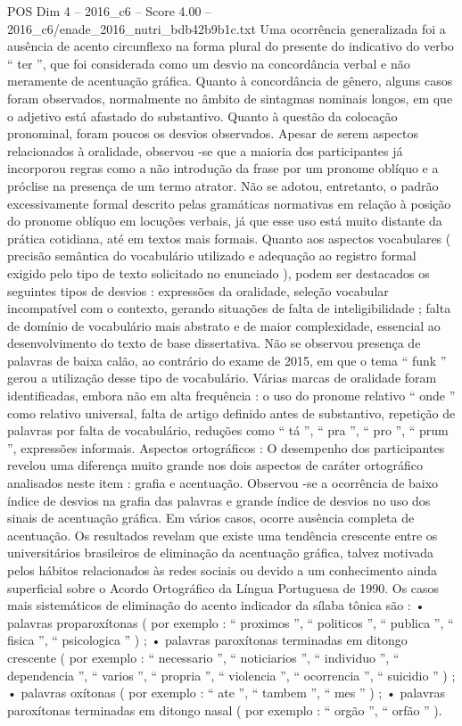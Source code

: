 \begin{textsample}{POS Dim 4 – 2016\_c6 – Score 4.00 – 2016\_c6/enade\_2016\_nutri\_bdb42b9b1c.txt}
Uma ocorrência generalizada foi a ausência de acento circunflexo na forma plural do presente do indicativo do verbo “ ter ”, que foi considerada como um desvio na concordância verbal e não meramente de acentuação gráfica.
Quanto à concordância de gênero, alguns casos foram observados, normalmente no âmbito de sintagmas nominais longos, em que o adjetivo está afastado do substantivo.
Quanto à questão da colocação pronominal, foram poucos os desvios observados.
Apesar de serem aspectos relacionados à oralidade, observou -se que a maioria dos participantes já incorporou regras como a não introdução da frase por um pronome oblíquo e a próclise na presença de um termo atrator.
Não se adotou, entretanto, o padrão excessivamente formal descrito pelas gramáticas normativas em relação à posição do pronome oblíquo em locuções verbais, já que esse uso está muito distante da prática cotidiana, até em textos mais formais.
Quanto aos aspectos vocabulares ( precisão semântica do vocabulário utilizado e adequação ao registro formal exigido pelo tipo de texto solicitado no enunciado ), podem ser destacados os seguintes tipos de desvios : expressões da oralidade, seleção vocabular incompatível com o contexto, gerando situações de falta de inteligibilidade ; falta de domínio de vocabulário mais abstrato e de maior complexidade, essencial ao desenvolvimento do texto de base dissertativa.
Não se observou presença de palavras de baixa calão, ao contrário do exame de 2015, em que o tema “ funk ” gerou a utilização desse tipo de vocabulário.
Várias marcas de oralidade foram identificadas, embora não em alta frequência : o uso do pronome relativo “ onde ” como relativo universal, falta de artigo definido antes de substantivo, repetição de palavras por falta de vocabulário, reduções como “ tá ”, “ pra ”, “ pro ”, “ prum ”, expressões informais.
Aspectos ortográficos : O desempenho dos participantes revelou uma diferença muito grande nos dois aspectos de caráter ortográfico analisados neste item : grafia e acentuação.
Observou -se a ocorrência de baixo índice de desvios na grafia das palavras e grande índice de desvios no uso dos sinais de acentuação gráfica.
Em vários casos, ocorre ausência completa de acentuação.
Os resultados revelam que existe uma tendência crescente entre os universitários brasileiros de eliminação da acentuação gráfica, talvez motivada pelos hábitos relacionados às redes sociais ou devido a um conhecimento ainda superficial sobre o Acordo Ortográfico da Língua Portuguesa de 1990.
Os casos mais sistemáticos de eliminação do acento indicador da sílaba tônica são : • palavras proparoxítonas ( por exemplo : “ proximos ”, “ politicos ”, “ publica ”, “ fisica ”, “ psicologica ” ) ; • palavras paroxítonas terminadas em ditongo crescente ( por exemplo : “ necessario ”, “ noticiarios ”, “ individuo ”, “ dependencia ”, “ varios ”, “ propria ”, “ violencia ”, “ ocorrencia ”, “ suicidio ” ) ; • palavras oxítonas ( por exemplo : “ ate ”, “ tambem ”, “ mes ” ) ; • palavras paroxítonas terminadas em ditongo nasal ( por exemplo : “ orgão ”, “ orfão ” ).

\end{textsample}
